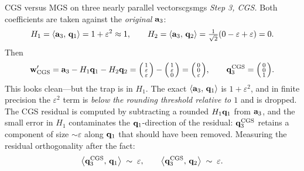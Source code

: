 \begin{workedexample}{CGS versus MGS on three nearly parallel vectors}{cgsmgs}
\smallskip
\emph{Step 3, CGS.} Both coefficients are taken against the \emph{original} $\mathbf{a}_3$:
\[
  H_1 = \left\langle \mathbf{a}_3,\, \mathbf{q}_1\right\rangle = 1 + \varepsilon^2 \approx 1, \qquad
  H_2 = \left\langle \mathbf{a}_3,\, \mathbf{q}_2\right\rangle
      = \tfrac{1}{\sqrt2}(0 - \varepsilon + \varepsilon) = 0.
\]
Then
\[
  \mathbf{w}'_{\text{CGS}} = \mathbf{a}_3 - H_1\mathbf{q}_1 - H_2\mathbf{q}_2
    = \begin{psmallmatrix}1\\\varepsilon\\\varepsilon\end{psmallmatrix}
    - \begin{psmallmatrix}1\\\varepsilon\\0\end{psmallmatrix}
    = \begin{psmallmatrix}0\\0\\\varepsilon\end{psmallmatrix},
  \qquad
  \mathbf{q}_3^{\text{CGS}} = \begin{psmallmatrix}0\\0\\1\end{psmallmatrix}.
\]
This looks clean---but the trap is in $H_1$. The exact $\left\langle \mathbf{a}_3,\, \mathbf{q}_1\right\rangle$ is
$1 + \varepsilon^2$, and in finite precision the $\varepsilon^2$ term is
\emph{below the rounding threshold relative to $1$} and is dropped. The CGS residual
is computed by subtracting a rounded $H_1 \mathbf{q}_1$ from $\mathbf{a}_3$, and the small error in
$H_1$ contaminates the $\mathbf{q}_1$-direction of the residual: $\mathbf{q}_3^{\text{CGS}}$ retains
a component of size $\sim\varepsilon$ along $\mathbf{q}_1$ that should have been removed.
Measuring the residual orthogonality after the fact:
\[
  \left\langle \mathbf{q}_3^{\text{CGS}},\, \mathbf{q}_1\right\rangle \;\sim\; \varepsilon, \qquad
  \left\langle \mathbf{q}_3^{\text{CGS}},\, \mathbf{q}_2\right\rangle \;\sim\; \varepsilon .
\]


\end{workedexample}
